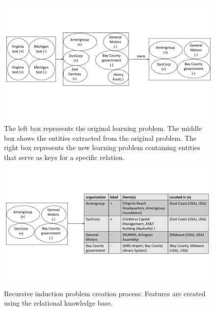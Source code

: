 \documentclass[twoside,11pt]{article}
\theoremstyle{definition}
\begin{document}
\begin{figure}[!h]
	\centering
	\includegraphics[width=\linewidth]{figure_rec1_example_new}
	\caption{The left box represents the original learning problem. The middle box shows the entities extracted from the original problem. The right box represents the new learning problem containing entities that serve as keys for a specific relation.}
	\label{fig:figure_rec1_example}
\end{figure}

\begin{figure}[!h]
	\centering
	\includegraphics[width=\linewidth]{figure_rec1_problem_new}
	\caption{Recursive induction problem creation process: Features are created using the relational knowledge base.}
	\label{fig:figure_rec1_problem}
\end{figure}
\end{document}
